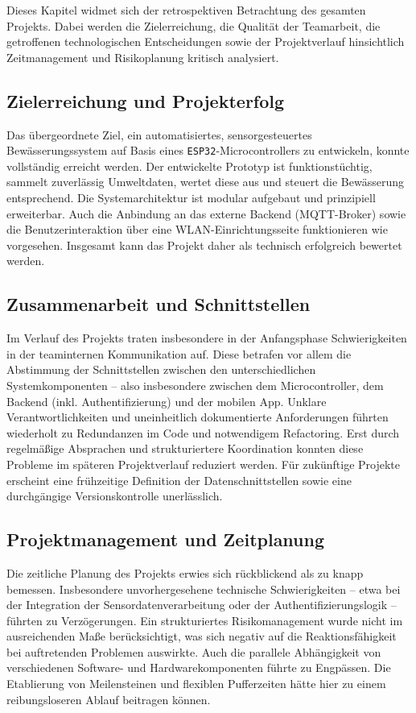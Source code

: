 Dieses Kapitel widmet sich der retrospektiven Betrachtung des gesamten Projekts. Dabei werden die Zielerreichung, die Qualität der Teamarbeit, die getroffenen technologischen Entscheidungen sowie der Projektverlauf hinsichtlich Zeitmanagement und Risikoplanung kritisch analysiert.

\subsection*{Zielerreichung und Projekterfolg}

Das übergeordnete Ziel, ein automatisiertes, sensorgesteuertes Bewässerungssystem auf Basis eines \texttt{ESP32}-Microcontrollers zu entwickeln, konnte vollständig erreicht werden. Der entwickelte Prototyp ist funktionstüchtig, sammelt zuverlässig Umweltdaten, wertet diese aus und steuert die Bewässerung entsprechend. Die Systemarchitektur ist modular aufgebaut und prinzipiell erweiterbar. Auch die Anbindung an das externe Backend (MQTT-Broker) sowie die Benutzerinteraktion über eine WLAN-Einrichtungsseite funktionieren wie vorgesehen. Insgesamt kann das Projekt daher als technisch erfolgreich bewertet werden.

\subsection*{Zusammenarbeit und Schnittstellen}

Im Verlauf des Projekts traten insbesondere in der Anfangsphase Schwierigkeiten in der teaminternen Kommunikation auf. Diese betrafen vor allem die Abstimmung der Schnittstellen zwischen den unterschiedlichen Systemkomponenten – also insbesondere zwischen dem Microcontroller, dem Backend (inkl. Authentifizierung) und der mobilen App. Unklare Verantwortlichkeiten und uneinheitlich dokumentierte Anforderungen führten wiederholt zu Redundanzen im Code und notwendigem Refactoring. Erst durch regelmäßige Absprachen und strukturiertere Koordination konnten diese Probleme im späteren Projektverlauf reduziert werden. Für zukünftige Projekte erscheint eine frühzeitige Definition der Datenschnittstellen sowie eine durchgängige Versionskontrolle unerlässlich.

\subsection*{Projektmanagement und Zeitplanung}

Die zeitliche Planung des Projekts erwies sich rückblickend als zu knapp bemessen. Insbesondere unvorhergesehene technische Schwierigkeiten – etwa bei der Integration der Sensordatenverarbeitung oder der Authentifizierungslogik – führten zu Verzögerungen. Ein strukturiertes Risikomanagement wurde nicht im ausreichenden Maße berücksichtigt, was sich negativ auf die Reaktionsfähigkeit bei auftretenden Problemen auswirkte. Auch die parallele Abhängigkeit von verschiedenen Software- und Hardwarekomponenten führte zu Engpässen. Die Etablierung von Meilensteinen und flexiblen Pufferzeiten hätte hier zu einem reibungsloseren Ablauf beitragen können.

